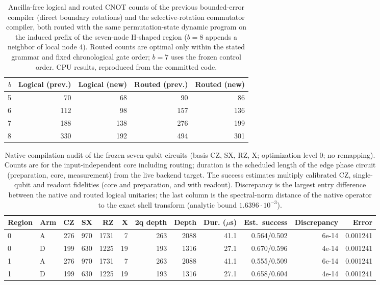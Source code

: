 \begin{table}[htbp]\centering\small
\caption{Ancilla-free logical and routed CNOT counts of the previous bounded-error compiler (direct boundary rotations) and the selective-rotation commutator compiler, both routed with the same permutation-state dynamic program on the induced prefix of the seven-node H-shaped region ($b=8$ appends a neighbor of local node 4). Routed counts are optimal only within the stated grammar and fixed chronological gate order; $b=7$ uses the frozen control order. CPU results, reproduced from the committed code.}\label{tab:q4-resources}
\begin{tabular}{rrrrr}\toprule $b$ & Logical (prev.) & Logical (new) & Routed (prev.) & Routed (new)\\\midrule
5 & 70 & 68 & 90 & 86\\
6 & 112 & 98 & 157 & 136\\
7 & 188 & 138 & 276 & 199\\
8 & 330 & 192 & 494 & 301\\
\bottomrule\end{tabular}\end{table}

\begin{table}[htbp]\centering\scriptsize\setlength{\tabcolsep}{3pt}
\caption{Native compilation audit of the frozen seven-qubit circuits (basis CZ, SX, RZ, X; optimization level 0; no remapping). Counts are for the input-independent core including routing; duration is the scheduled length of the edge phase circuit (preparation, core, measurement) from the live backend target. The success estimates multiply calibrated CZ, single-qubit and readout fidelities (core and preparation, and with readout). Discrepancy is the largest entry difference between the native and routed logical unitaries; the last column is the spectral-norm distance of the native operator to the exact shell transform (analytic bound $1.6396\cdot10^{-3}$).}\label{tab:q4-native}
\begin{tabular}{llrrrrrrrrrr}\toprule Region & Arm & CZ & SX & RZ & X & 2q depth & Depth & Dur. ($\mu$s) & Est.\ success & Discrepancy & Error\\\midrule
0 & A & 276 & 970 & 1731 & 7 & 263 & 2088 & 41.1 & 0.564/0.502 & 6e-14 & 0.001241\\
0 & D & 199 & 630 & 1225 & 19 & 193 & 1316 & 27.1 & 0.670/0.596 & 4e-14 & 0.001241\\
1 & A & 276 & 970 & 1731 & 7 & 263 & 2088 & 41.1 & 0.555/0.509 & 6e-14 & 0.001241\\
1 & D & 199 & 630 & 1225 & 19 & 193 & 1316 & 27.1 & 0.658/0.604 & 4e-14 & 0.001241\\
\bottomrule\end{tabular}\end{table}

